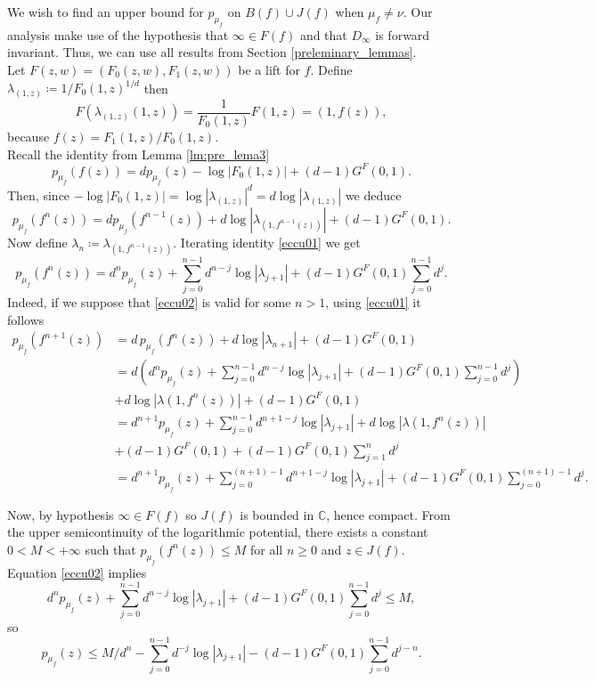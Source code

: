 We wish to find an upper bound for $p_{\mu_f}$ on $B(f)\cup J(f)$ when $\mu_f\neq \nu$. Our analysis make use of the hypothesis that $\infty\in F(f)$ and that $D_\infty$ is forward invariant. Thus, we can use all results from Section \ref{preleminary_lemmas}.\\

Let $F(z,w)=(F_0(z,w),F_1(z,w))$ be a lift for $f$. Define $\lambda_{(1,z)}\coloneqq 1/F_0(1,z)^{1/d}$ then
$$F(\lambda_{(1,z)}(1,z)) = \frac{1}{F_0(1,z)}F(1,z) = (1,f(z)),$$
because $f(z) = F_1(1,z)/F_0(1,z).$\\

Recall the identity from Lemma \ref{lm:pre_lema3}
$$p_{\mu_f}(f(z))=dp_{\mu_f}(z)-\log|F_0(1,z)|+(d-1)G^F(0,1).$$
Then, since $-\log|F_0(1,z)| = \log|\lambda_{(1,z)}|^d=d\log|\lambda_{(1,z)}|$ we deduce
\begin{equation}\label{eccu01}
p_{\mu_f}(f^n(z)) =dp_{\mu_f}(f^{n-1}(z))+d\log|\lambda_{(1,f^{n-1}(z))}| + (d-1)G^F(0,1).
\end{equation}
Now define $\lambda_n \coloneqq \lambda_{(1,f^{n-1}(z))}$. Iterating identity \eqref{eccu01} we get
\begin{equation}\label{eccu02}
p_{\mu_f}(f^n(z)) = d^np_{\mu_f}(z) + \sum_{j=0}^{n-1}d^{n-j}\log|\lambda_{j+1}| + (d-1)G^F(0,1)\sum_{j=0}^{n-1}d^j.
\end{equation}
Indeed, if we suppose that \eqref{eccu02} is valid for some $n>1$, using \eqref{eccu01} it follows
\begin{align*}
p_{\mu_f}(f^{n+1}(z)) &= d\,p_{\mu_f}(f^{n}(z))+d\log|\lambda_{n+1}| + (d-1)G^F(0,1)\\
&= d\left(d^np_{\mu_f}(z) + \sum_{j=0}^{n-1}d^{n-j}\log|\lambda_{j+1}| + (d-1)G^F(0,1)\sum_{j=0}^{n-1}d^j\right)\\
&+d\log|\lambda(1,f^{n}(z))| + (d-1)G^F(0,1)\\
&= d^{n+1}p_{\mu_f}(z) + \sum_{j=0}^{n-1}d^{n+1-j}\log|\lambda_{j+1}|+d\log|\lambda(1,f^{n}(z))|\\
&+ (d-1)G^F(0,1)+(d-1)G^F(0,1)\sum_{j=1}^{n}d^j\\
&= d^{n+1}p_{\mu_f}(z) + \sum_{j=0}^{(n+1)-1}d^{n+1-j}\log|\lambda_{j+1}|+(d-1)G^F(0,1)\sum_{j=0}^{(n+1)-1}d^j.
\end{align*}

Now, by hypothesis $\infty\in F(f)$ so $J(f)$ is bounded in $\mathbb{C}$, hence compact. From the upper semicontinuity of the logarithmic potential, there exists a constant $0<M<+\infty$ such that $p_{\mu_f}(f^n(z)) \leq M$ for all $n\geq 0$ and $z\in J(f)$. Equation \eqref{eccu02} implies
$$d^np_{\mu_f}(z) + \sum_{j=0}^{n-1}d^{n-j}\log|\lambda_{j+1}| + (d-1)G^F(0,1)\sum_{j=0}^{n-1}d^j\leq M,$$
so
\begin{equation}\label{eccu03}
p_{\mu_f}(z) \leq M/d^n - \sum_{j=0}^{n-1}d^{-j}\log|\lambda_{j+1}| - (d-1)G^F(0,1)\sum_{j=0}^{n-1}d^{j-n}.
\end{equation}

